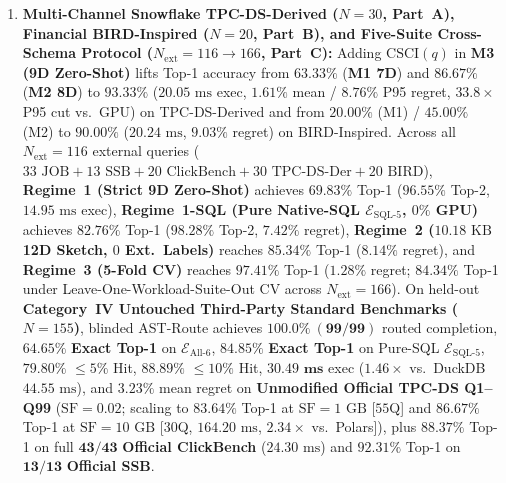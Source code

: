 \documentclass[10pt,a4paper]{article}
\begin{document}
\begin{enumerate}[leftmargin=1.5em,itemsep=1pt]
    \item \textbf{Multi-Channel Snowflake TPC-DS-Derived ($N=30$, Part~A), Financial BIRD-Inspired ($N=20$, Part~B), and Five-Suite Cross-Schema Protocol ($N_{\text{ext}}=116\rightarrow 166$, Part~C):} Adding $\text{CSCI}(q)$ in \textbf{M3 (9D Zero-Shot)} lifts Top-1 accuracy from $63.33\%$ (\textbf{M1 7D}) and $86.67\%$ (\textbf{M2 8D}) to $\mathbf{93.33\%}$ ($20.05\text{ ms}$ exec, $1.61\%$ mean / $8.76\%$ P95 regret, $33.8\times$ P95 cut vs.\ GPU) on TPC-DS-Derived and from $20.00\%$ (M1) / $45.00\%$ (M2) to $\mathbf{90.00\%}$ ($20.24\text{ ms}$, $9.03\%$ regret) on BIRD-Inspired. Across all $N_{\text{ext}}=116$ external queries ($33\text{ JOB}+13\text{ SSB}+20\text{ ClickBench}+30\text{ TPC-DS-Der}+20\text{ BIRD}$), \textbf{Regime~1 (Strict 9D Zero-Shot)} achieves $\mathbf{69.83\%}$ Top-1 ($\mathbf{96.55\%}$ Top-2, $14.95\text{ ms}$ exec), \textbf{Regime~1-SQL (Pure Native-SQL $\mathcal{E}_{\text{SQL-5}}$, $0\%$ GPU)} achieves $\mathbf{82.76\%}$ Top-1 ($\mathbf{98.28\%}$ Top-2, $7.42\%$ regret), \textbf{Regime~2 ($10.18\text{ KB}$ 12D Sketch, $0$ Ext.\ Labels)} reaches $\mathbf{85.34\%}$ Top-1 ($8.14\%$ regret), and \textbf{Regime~3 (5-Fold CV)} reaches $\mathbf{97.41\%}$ Top-1 ($1.28\%$ regret; $84.34\%$ Top-1 under Leave-One-Workload-Suite-Out CV across $N_{\text{ext}}=166$). On held-out \textbf{Category~IV Untouched Third-Party Standard Benchmarks ($N=155$)}, blinded AST-Route achieves $\mathbf{100.0\%\ (99/99)}$ routed completion, $\mathbf{64.65\%}$ \textbf{Exact Top-1} on $\mathcal{E}_{\text{All-6}}$, $\mathbf{84.85\%}$ \textbf{Exact Top-1} on Pure-SQL $\mathcal{E}_{\text{SQL-5}}$, $\mathbf{79.80\%}$ $\le 5\%$ Hit, $\mathbf{88.89\%}$ $\le 10\%$ Hit, $\mathbf{30.49\text{ ms}}$ exec ($1.46\times$ vs.\ DuckDB $44.55\text{ ms}$), and $\mathbf{3.23\%}$ mean regret on \textbf{Unmodified Official TPC-DS Q1--Q99} ($\text{SF}=0.02$; scaling to $\mathbf{83.64\%}$ Top-1 at $\text{SF}=1\text{ GB}$ [$55$Q] and $\mathbf{86.67\%}$ Top-1 at $\text{SF}=10\text{ GB}$ [$30$Q, $164.20\text{ ms}$, $2.34\times$ vs.\ Polars]), plus $\mathbf{88.37\%}$ Top-1 on full $\mathbf{43/43}$ \textbf{Official ClickBench} ($24.30\text{ ms}$) and $\mathbf{92.31\%}$ Top-1 on $\mathbf{13/13}$ \textbf{Official SSB}.

\end{enumerate}
\end{document}
